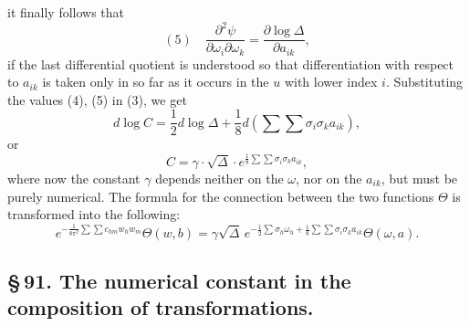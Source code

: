 \documentclass[10pt]{article}
\begin{document}
it finally follows that
\[
(5)\quad
\frac{\partial^2\psi}{\partial\omega_i\partial\omega_k}
=
\frac{\partial\log\Delta}{\partial a_{ik}},
\]
if the last differential quotient is understood so that differentiation with respect to \(a_{ik}\) is taken only in so far as it occurs in the \(u\) with lower index \(i\). Substituting the values (4), (5) in (3), we get
\[
d\log C=\frac12d\log\Delta+\frac18d\!\left(\sum\sum\sigma_i\sigma_ka_{ik}\right),
\]
or
\[
C=\gamma\cdot\sqrt{\Delta}\cdot e^{\frac18\sum\sum\sigma_i\sigma_ka_{ik}},
\]
where now the constant \(\gamma\) depends neither on the \(\omega\), nor on the \(a_{ik}\), but must be purely numerical. The formula for the connection between the two functions \(\Theta\) is transformed into the following:
\[
e^{-\frac{1}{8\pi^2}\sum\sum c_{hm}w_hw_m}
\Theta(w,b)
=
\gamma\sqrt{\Delta}\,
e^{-\frac12\sum\sigma_h\omega_h+\frac18\sum\sum\sigma_i\sigma_ka_{ik}}
\Theta(\omega,a).
\]



\subsection*{\S\,91. The numerical constant in the composition of transformations.}
\end{document}
